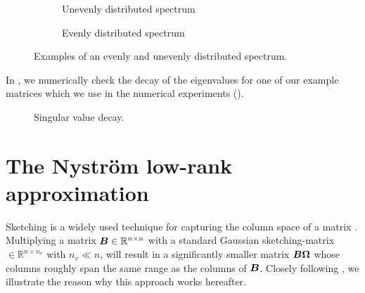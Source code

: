 \begin{figure}
    \centering
    \begin{subfigure}[t]{0.45\columnwidth}
        
        \caption{Unevenly distributed spectrum}
    \end{subfigure}
    \begin{subfigure}[t]{0.45\columnwidth}
        
        \caption{Evenly distributed spectrum}
    \end{subfigure}      
    \caption{Examples of an evenly and unevenly distributed spectrum.}
    \label{fig:3-nystrom-evenly-distributed-spectrum}
\end{figure}

In , we numerically check the decay
of the eigenvalues for one of our example matrices which we use in the numerical
experiments ().
\begin{figure}[ht]
    \centering
    
    \caption{Singular value decay. }
    \label{fig:3-nystrom-singular-value-decay}
\end{figure}


\section{The Nystr\"om low-rank approximation}
\label{sec:3-nystrom-nystrom}

Sketching is a widely used technique for capturing the column space of a matrix
\cite{halko2011finding,woodruff2014sketching,lin2017randomized,tropp2017sketching,tropp2023randomized}.
Multiplying a matrix $\boldsymbol{B} \in \mathbb{R}^{n \times n}$ with a standard Gaussian
\gls{sketching-matrix} $ \in \mathbb{R}^{n \times n_v}$ with $n_v \ll n$, will
result in a significantly smaller matrix $\boldsymbol{B}\boldsymbol{\Omega}$ whose
columns roughly span the same range as the columns of $\boldsymbol{B}$.
Closely following \cite[Section~2.1]{tropp2023randomized}, we illustrate the
reason why this approach works hereafter.\\

